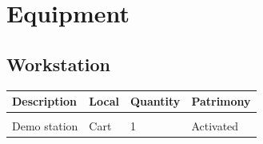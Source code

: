 \newpage
\section{Equipment}
\setlength{\columnsep}{0.5cm}
\subsection{Workstation}
\begin{tabularx}{\textwidth}{ Y  Y  Y  Y }
    \textbf{Description} &  \textbf{Local} &  \textbf{Quantity} & \textbf{Patrimony}\\
    \hline \\
     Demo station & Cart & 1 & Activated
\end{tabularx}
\vspace{1cm}

